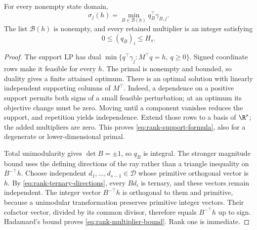 \begin{lemma}\label{lem:rank-duals}
For every nonempty state domain,
\begin{equation}\label{eq:rank-support-formula}
 \sigma_j(h)=\min_{B\in\mathcal B(h)}q_B^\top\gamma_{B,j}.
\end{equation}
The list $\mathcal B(h)$ is nonempty, and every retained multiplier is
an integer satisfying
\begin{equation}\label{eq:rank-multiplier-bound}
                     0\le(q_B)_i\le H_s.
\end{equation}
\end{lemma}
\begin{proof}
The support LP has dual
$\min\{q^\top\gamma_j:M^\top q=h,\ q\ge0\}$. Signed coordinate
rows make it feasible for every $h$. The primal is nonempty and bounded,
so duality gives a finite attained optimum. There is an optimal solution
with linearly independent supporting columns of $M^\top$. Indeed, a
dependence on a positive support permits both signs of a small feasible
perturbation; at an optimum its objective change must be zero. Moving
until a component vanishes reduces the support, and repetition yields
independence. Extend those rows to a basis of $\R^s$; the added
multipliers are zero. This proves \eqref{eq:rank-support-formula}, also
for a degenerate or lower-dimensional primal.

Total unimodularity gives $\det B=\pm1$, so $q_B$ is integral. The
stronger magnitude bound uses the defining directions of the ray rather
than a triangle inequality on $B^{-\top}h$. Choose independent
$d_1,\ldots,d_{s-1}\in\mathcal D$ whose primitive orthogonal vector
is $h$. By \eqref{eq:rank-ternary-directions}, every $Bd_i$ is ternary,
and these vectors remain independent. The integer vector $B^{-\top}h$
is orthogonal to them and primitive, because a unimodular transformation
preserves primitive integer vectors. Their cofactor vector, divided by
its common divisor, therefore equals $B^{-\top}h$ up to sign. Hadamard's
bound proves \eqref{eq:rank-multiplier-bound}. Rank one is immediate.
\end{proof}

